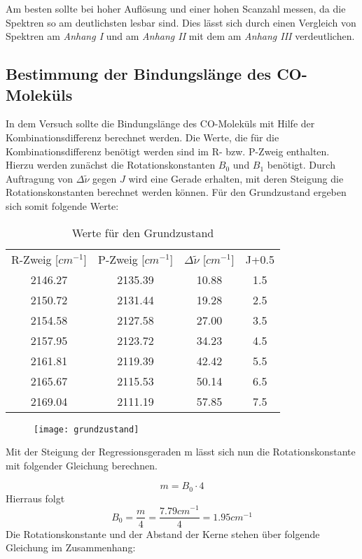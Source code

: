 \documentclass[12pt]{article}
\begin{document}
Am besten sollte bei hoher Auflösung und einer hohen Scanzahl messen, da die Spektren so am deutlichsten lesbar sind. 
Dies lässt sich durch einen Vergleich von Spektren am \textit{Anhang I} und am \textit{Anhang II} mit dem am \textit{Anhang III} verdeutlichen.

\subsection{Bestimmung der Bindungslänge des CO-Moleküls}
In dem Versuch sollte die Bindungslänge des CO-Moleküls mit Hilfe der Kombinationsdifferenz berechnet werden.
Die Werte, die für die Kombinationsdifferenz benötigt werden sind im R- bzw. P-Zweig enthalten. 
Hierzu werden zunächst die Rotationskonstanten $B_0$ und $B_1$ benötigt.
Durch Auftragung von $\Delta \tilde {\nu}$ gegen $J$ wird eine Gerade erhalten, 
mit deren Steigung die Rotationskonstanten berechnet werden können. 
Für den Grundzustand ergeben sich somit folgende Werte:

\begin{table}[htpb]
  \centering
  \caption{Werte für den Grundzustand}
  \label{tab:grund}
  \begin{tabular}{cccc}
    R-Zweig [$cm^{-1}$] & P-Zweig [$cm^{-1}$] & $\Delta \tilde {\nu}$ [$cm^{-1}$] & J+0.5\\
    2146.27 & 2135.39 & 10.88 & 1.5 \\
2150.72 & 2131.44 &  19.28 & 2.5\\
2154.58 & 2127.58 &  27.00 & 3.5\\
2157.95 & 2123.72 &  34.23 & 4.5\\
2161.81 & 2119.39 &  42.42 & 5.5\\
2165.67 & 2115.53 &  50.14 & 6.5\\
2169.04 & 2111.19 &  57.85 & 7.5\\
  
  
  \end{tabular}

\end{table}


\begin{figure}[H]
\centering
\texttt{[image: grundzustand]}
\end{figure} 

Mit der Steigung der Regressionsgeraden m lässt sich nun die Rotationskonstante mit folgender Gleichung berechnen.

\begin{equation}
    m = B_0 \cdot 4
\end{equation}
 Hierraus folgt 
 \begin{equation}
     B_0 = \frac{m}{4} = \frac{7.79 cm^{-1}}{4} = 1.95 cm ^{-1}
 \end{equation}
  Die Rotationskonstante und der Abstand der Kerne stehen über folgende Gleichung im Zusammenhang:
  
\end{document}
